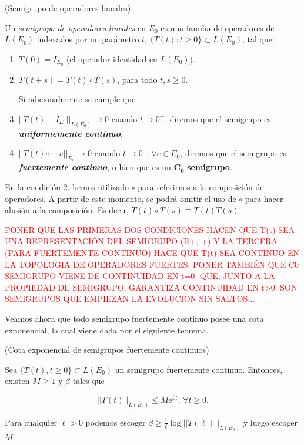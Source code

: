 \begin{Definicion}{(Semigrupo de operadores lineales)}
\label{ch:semigrupos:def:semigrupo}

Un \textit{semigrupo de operadores lineales} en $E_0$ es una familia de operadores de $L(E_0)$ indexados por un parámetro $t$, $\{T(t) : t \geq 0\} \subset L(E_0)$, tal que:

\begin{enumerate}
    \item $T(0) = I_{E_0}$ (el operador identidad en $L(E_0)$).

    \item $T(t+s) = T(t) \circ T(s)$, para todo $t,s \geq 0$.

    Si adicionalmente se cumple que

    \item $||T(t) - I_{E_0}||_{L(E_0)} \rightarrow 0$ cuando $t \rightarrow 0^+$, diremos que el semigrupo es \textbf{\textit{uniformemente continuo}}.

     \item $||T(t)e - e||_{E_0} \rightarrow 0$ cuando $t \rightarrow 0^+, \forall e \in E_0$, diremos que el semigrupo es \textbf{\textit{fuertemente continuo}}, o bien que es un $\boldsymbol{C_0}$ \textbf{semigrupo}.
\end{enumerate}

En la condición $2.$ hemos utilizado $\circ$ para referirnos a la composición de operadores. A partir de este momento, se podrá omitir el uso de $\circ$ para hacer alusión a la composición. Es decir, $T(t) \circ T(s) \equiv T(t)T(s)$.

\textcolor{red}{PONER QUE LAS PRIMERAS DOS CONDICIONES HACEN QUE T(t) SEA UNA REPRESENTACIÓN DEL SEMIGRUPO (R+, +) Y LA TERCERA (PARA FUERTEMENTE CONTINUO) HACE QUE T(t) SEA CONTINUO EN LA TOPOLOGIA DE OPERADORES FUERTES. PONER TAMBIÉN QUE C0 SEMIGRUPO VIENE DE CONTINUIDAD EN t=0, QUE, JUNTO A LA PROPIEDAD DE SEMIGRUPO, GARANTIZA CONTINUIDAD EN t>0. SON SEMIGRUPOS QUE EMPIEZAN LA EVOLUCION SIN SALTOS...}
\end{Definicion}

Veamos ahora que todo semigrupo fuertemente continuo posee una cota exponencial, la cual viene dada por el siguiente teorema.\\

\begin{Teorema}{(Cota exponencial de semigrupos fuertemente continuos)}
\label{ch:semigrupos:th:cotaExp}

Sea $\{T(t), t \geq 0 \} \subset L(E_0)$ un semigrupo fuertemente continuo. Entonces, existen $M \geq 1$ y $\beta$ tales que

\[||T(t)||_{L(E_0)} \leq M\mathrm{e}^{\beta t}, \, \forall t \geq 0.\]

Para cualquier $\ell > 0$ podemos escoger $\beta \geq \frac{1}{\ell} \log ||T(\ell)||_{L(E_0)}$ y luego escoger $M$.
\end{Teorema}

